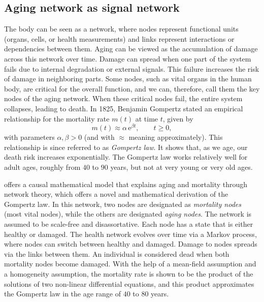 \documentclass[11pt]{article}
\numberwithin{equation}{section}
\begin{document}

\subsection{Aging network as signal network}
\label{ss.AN}

The body can be seen as a network, where nodes represent functional units (organs, cells, or health measurements) and links represent interactions or dependencies between them. Aging can be viewed as the accumulation of damage across this network over time. Damage can spread when one part of the system fails due to internal degradation or external signals. This failure increases the risk of damage in neighboring parts. Some nodes, such as vital organs in the human body, are critical for the overall function, and we can, therefore, call them the key nodes of the aging network. When these critical nodes fail, the entire system collapses, leading to death. In 1825, Benjamin Gompertz \cite{G1825} stated an empirical relationship for the mortality rate $m(t)$ at time $t$, given by 
\begin{equation*}
m(t) \approx \alpha\, \mathrm{e}^{\beta t}, \qquad t \geq 0,
\end{equation*}
with parameters $\alpha,\beta>0$ (and with $\approx$ meaning approximately). This relationship is since referred to as \emph{Gompertz law}. It shows that, as we age, our death risk increases exponentially. The Gompertz law works relatively well for adult ages, roughly from $40$ to $90$ years, but not at very young or very old ages.

\cite{Aging} offers a causal mathematical model that explains aging and mortality through network theory, which offers a novel and mathematical derivation of the Gompertz law. In this network, two nodes are designated as \emph{mortality nodes} (most vital nodes), while the others are designated \emph{aging nodes}. The network is assumed to be scale-free and disassortative. Each node has a state that is either healthy or damaged. The health network evolves over time via a Markov process, where nodes can switch between healthy and damaged. Damage to nodes spreads via the links between them. An individual is considered dead when both mortality nodes become damaged. With the help of a mean-field assumption and a homogeneity assumption, the mortality rate is shown to be the product of the solutions of two non-linear differential equations, and this product approximates the Gompertz law in the age range of $40$ to $80$ years.
\end{document}
